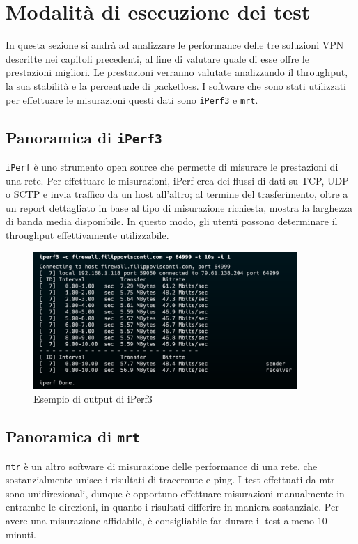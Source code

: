 \section{Modalità di esecuzione dei test}
In questa sezione si andrà ad analizzare le performance delle tre soluzioni VPN descritte nei capitoli precedenti, al fine di valutare quale di esse offre le prestazioni migliori.
Le prestazioni verranno valutate analizzando il throughput, la sua stabilità e la percentuale di packetloss.
I software che sono stati utilizzati per effettuare le misurazioni questi dati sono \texttt{iPerf3} e \texttt{mrt}.

\subsection{Panoramica di \texttt{iPerf3}}
\texttt{iPerf} è uno strumento open source che permette di misurare le prestazioni di una rete.
Per effettuare le misurazioni, iPerf crea dei flussi di dati su TCP, UDP o SCTP e invia traffico da un host all'altro; al termine del trasferimento, oltre a un report dettagliato in base al tipo di misurazione richiesta, mostra la larghezza di banda media disponibile.
In questo modo, gli utenti possono determinare il throughput effettivamente utilizzabile.

\begin{figure}[ht]
    \centering
    \includegraphics[width=10cm]{figure/iperfSample.png}
    \caption{Esempio di output di iPerf3}
\end{figure}

\subsection{Panoramica di \texttt{mrt}}
\texttt{mtr} è un altro software di misurazione delle performance di una rete, che sostanzialmente unisce i risultati di traceroute e ping.
I test effettuati da mtr sono unidirezionali, dunque è opportuno effettuare misurazioni manualmente in entrambe le direzioni, in quanto i risultati differire in maniera sostanziale. Per avere una misurazione affidabile, è consigliabile far durare il test almeno 10 minuti.


